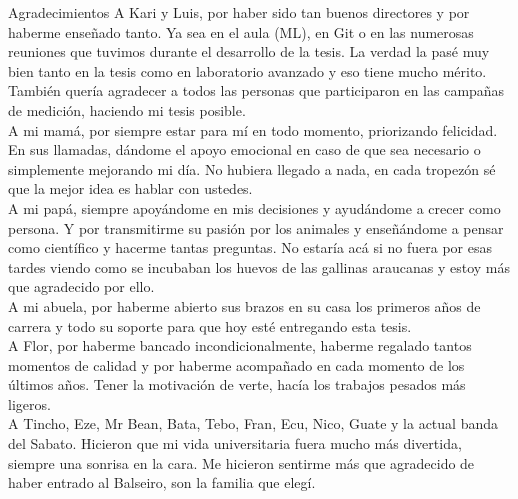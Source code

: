 \documentclass[12pt,screen,twoside,pagebackref]{ibtesis}
\begin{document}
\begin{postliminary}


\begin{seccion}{Agradecimientos}
A Kari y Luis, por haber sido tan buenos directores y por haberme enseñado tanto. Ya sea en el aula (ML), en Git o en las numerosas reuniones que tuvimos durante el desarrollo de la tesis. La verdad la pasé muy bien tanto en la tesis como en laboratorio avanzado y eso tiene mucho mérito. También quería agradecer a todos las personas que participaron en las campañas de medición, haciendo mi tesis posible. \\

A mi mamá, por siempre estar para mí en todo momento, priorizando felicidad. En sus llamadas, dándome el apoyo emocional en caso de que sea necesario o simplemente mejorando mi día. No hubiera llegado a nada, en cada tropezón sé que la mejor idea es hablar con ustedes. \\

A mi papá, siempre apoyándome en mis decisiones y ayudándome a crecer como persona. Y por transmitirme su pasión por los animales y enseñándome a pensar como científico y hacerme tantas preguntas. No estaría acá si no fuera por esas tardes viendo como se incubaban los huevos de las gallinas araucanas y estoy más que agradecido por ello. \\

A mi abuela, por haberme abierto sus brazos en su casa los primeros años de carrera y todo su soporte para que hoy esté entregando esta tesis.\\

A Flor, por haberme bancado incondicionalmente, haberme regalado tantos momentos de calidad y por haberme acompañado en cada momento de los últimos años. Tener la motivación de verte, hacía los trabajos pesados más ligeros. \\

A Tincho, Eze, Mr Bean, Bata, Tebo, Fran, Ecu, Nico, Guate y la actual banda del Sabato. Hicieron que mi vida universitaria fuera mucho más divertida, siempre una sonrisa en la cara. Me hicieron sentirme más que agradecido de haber entrado al Balseiro, son la familia que elegí. 
\end{seccion}

\end{postliminary}
\end{document}
